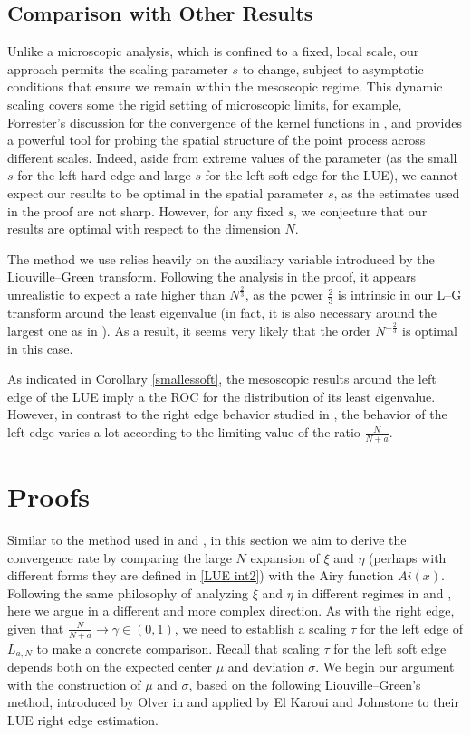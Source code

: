 \documentclass[11pt]{article}
\numberwithin{equation}{section}%
\numberwithin{theorem}{section}
\begin{document}
\subsection{Comparison with Other Results}
Unlike a microscopic analysis, which is confined to a fixed, local scale, our approach permits the scaling parameter $s$ to change, subject to asymptotic conditions that ensure we remain within the mesoscopic regime. This dynamic scaling covers some the rigid setting of microscopic limits, for example, Forrester's discussion for the convergence of the kernel functions in \cite{log-gas}, and provides a powerful tool for probing the spatial structure of the point process across different scales. Indeed, aside from extreme values of the parameter (as the small $s$ for the left hard edge and large $s$ for the left soft edge for the LUE), we cannot expect our results to be optimal in the spatial parameter $s$, as the estimates used in the proof are not sharp. However, for any fixed $s$, we conjecture that our results are optimal with respect to the dimension $N$.

The method we use relies heavily on the auxiliary variable introduced by the Liouville--Green transform. Following the analysis in the proof, it appears unrealistic to expect a rate higher than $N^{\frac{2}{3}}$, as the power $\frac{2}{3}$ is intrinsic in our L--G transform around the least eigenvalue (in fact, it is also necessary around the largest one as in \cite{el2006rate}). As a result, it seems very likely that the order $N^{-\frac{2}{3}}$ is optimal in this case.

As indicated in Corollary \ref{smallessoft}, the mesoscopic results around the left edge of the LUE imply a the ROC for the distribution of its least eigenvalue. However, in contrast to the right edge behavior studied in \cite{el2006rate}, the behavior of the left edge varies a lot according to the limiting value of the ratio $\frac{N}{N+a}$.

\section{Proofs}\label{Proof}
Similar to the method used in \cite{el2006rate} and \cite{johnstone2001distribution},
in this section we aim to derive the convergence rate by comparing the large $N$ expansion of $\xi$ and $\eta$ (perhaps with different forms they are defined in \eqref{LUE int2}) with the Airy function $Ai(x)$. Following the same philosophy of analyzing $\xi$ and $\eta$ in different regimes in \cite{el2006rate} and \cite{johnstone2001distribution}, here we argue in a different and more complex direction. As with the right edge, given that $\frac{N}{N+a}\rightarrow\gamma\in(0,1)$, we need to establish a scaling $\tau$ for the left edge of $L_{a,N}$ to make a concrete comparison. Recall that scaling $\tau$ for the left soft edge depends both on the expected center $\mu$ and deviation $\sigma$. We begin our argument with the construction of $\mu$ and $\sigma$, based on the following Liouville--Green's method, introduced by Olver in \cite{olver1997asymptotics} and applied by El Karoui \cite{el2006rate} and Johnstone \cite{johnstone2001distribution} to their LUE right edge estimation.
\end{document}
